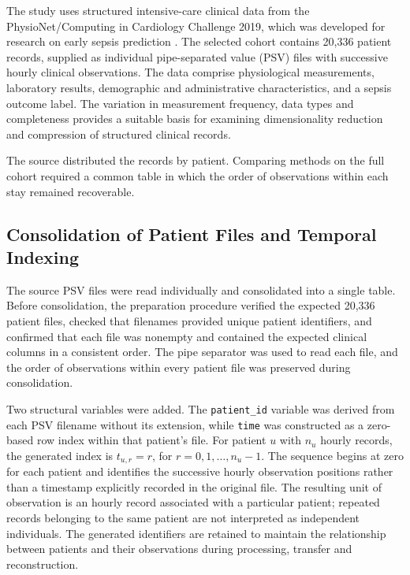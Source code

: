 The study uses structured intensive-care clinical data from the
PhysioNet/\allowbreak Computing in Cardiology Challenge 2019, which was developed
for research on early sepsis prediction \citep{Reyna2019,Reyna2020}. The selected cohort contains 20,336 patient records,
supplied as individual pipe-separated value (PSV) files with successive
hourly clinical observations. The data comprise physiological
measurements, laboratory results, demographic and administrative
characteristics, and a sepsis outcome label. The variation in
measurement frequency, data types and completeness provides a suitable
basis for examining dimensionality reduction and compression of
structured clinical records.

\noindent The source distributed the records by patient. Comparing methods on the full cohort required a common table in which the order of observations within each stay remained recoverable.

\subsection{Consolidation of Patient Files and Temporal Indexing}\label{consolidation-of-patient-files-and-temporal-indexing}

The source PSV files were read individually and consolidated into a
single table. Before consolidation, the preparation procedure verified
the expected 20,336 patient files, checked that filenames provided
unique patient identifiers, and confirmed that each file was nonempty
and contained the expected clinical columns in a consistent order. The
pipe separator was used to read each file, and the order of observations
within every patient file was preserved during consolidation.

\noindent Two structural variables were added. The \texttt{patient\_id} variable
was derived from each PSV filename without its extension, while
\texttt{time} was constructed as a zero-based row index within that
patient's file. For patient \(u\) with \(n_u\) hourly records, the
generated index is \(t_{u,r}=r\), for \(r=0,1,\ldots,n_u-1\). The
sequence begins at zero for each patient and identifies the successive
hourly observation positions rather than a timestamp explicitly recorded
in the original file. The resulting unit of observation is an hourly
record associated with a particular patient; repeated records belonging
to the same patient are not interpreted as independent individuals. The
generated identifiers are retained to maintain the relationship between
patients and their observations during processing, transfer and
reconstruction.

